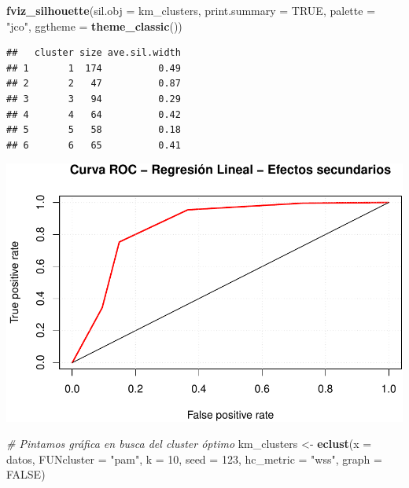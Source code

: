 \documentclass[spanish,]{article}
\newenvironment{Shaded}{\begin{snugshade}}{\end{snugshade}}
\newcommand{\KeywordTok}[1]{\textcolor[rgb]{0.13,0.29,0.53}{\textbf{#1}}}
\newcommand{\DataTypeTok}[1]{\textcolor[rgb]{0.13,0.29,0.53}{#1}}
\newcommand{\DecValTok}[1]{\textcolor[rgb]{0.00,0.00,0.81}{#1}}
\newcommand{\StringTok}[1]{\textcolor[rgb]{0.31,0.60,0.02}{#1}}
\newcommand{\CommentTok}[1]{\textcolor[rgb]{0.56,0.35,0.01}{\textit{#1}}}
\newcommand{\OtherTok}[1]{\textcolor[rgb]{0.56,0.35,0.01}{#1}}
\newcommand{\NormalTok}[1]{#1}
\begin{document}
\begin{Shaded}
\begin{Highlighting}[]
\KeywordTok{fviz_silhouette}\NormalTok{(}\DataTypeTok{sil.obj =}\NormalTok{ km_clusters, }\DataTypeTok{print.summary =} \OtherTok{TRUE}\NormalTok{, }\DataTypeTok{palette =} \StringTok{"jco"}\NormalTok{,}
                \DataTypeTok{ggtheme =} \KeywordTok{theme_classic}\NormalTok{()) }
\end{Highlighting}
\end{Shaded}

\begin{verbatim}
##   cluster size ave.sil.width
## 1       1  174          0.49
## 2       2   47          0.87
## 3       3   94          0.29
## 4       4   64          0.42
## 5       5   58          0.18
## 6       6   65          0.41
\end{verbatim}

\includegraphics{practica-original_files/figure-latex/unnamed-chunk-169-1.pdf}

\begin{Shaded}
\begin{Highlighting}[]
\CommentTok{# Pintamos gráfica en busca del cluster óptimo}
\NormalTok{km_clusters <-}\StringTok{ }\KeywordTok{eclust}\NormalTok{(}\DataTypeTok{x =}\NormalTok{ datos, }\DataTypeTok{FUNcluster =} \StringTok{"pam"}\NormalTok{, }\DataTypeTok{k =} \DecValTok{10}\NormalTok{, }\DataTypeTok{seed =} \DecValTok{123}\NormalTok{,}
                      \DataTypeTok{hc_metric =} \StringTok{"wss"}\NormalTok{,  }\DataTypeTok{graph =} \OtherTok{FALSE}\NormalTok{)}
\end{Highlighting}
\end{Shaded}
\end{document}
